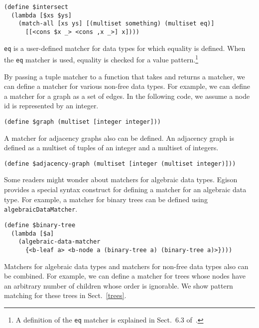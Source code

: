 \documentclass{article}
\begin{document}
\begin{lstlisting}[language=egison]
(define $intersect
  (lambda [$xs $ys]
    (match-all [xs ys] [(multiset something) (multiset eq)]
      [[<cons $x _> <cons ,x _>] x])))
\end{lstlisting}

\noindent \texttt{eq} is a user-defined matcher for data types for which equality is defined. 
When the \texttt{eq} matcher is used, equality is checked for a value pattern.\footnote{A definition of the \texttt{eq} matcher is explained in Sect.~6.3 of~\cite{egi2018Aplas}.}

By passing a tuple matcher to a function that takes and returns a matcher, we can define a matcher for various non-free data types.
For example, we can define a matcher for a graph as a set of edges.
In the following code, we assume a node id is represented by an integer.

{\footnotesize
\begin{lstlisting}[language=egison]
(define $graph (multiset [integer integer]))
\end{lstlisting}
}

\noindent A matcher for adjacency graphs also can be defined.
An adjacency graph is defined as a multiset of tuples of an integer and a multiset of integers.

{\footnotesize
\begin{lstlisting}[language=egison]
(define $adjacency-graph (multiset [integer (multiset integer)]))
\end{lstlisting}
}


\medskip

Some readers might wonder about matchers for algebraic data types.
Egison provides a special syntax construct for defining a matcher for an algebraic data type.
For example, a matcher for binary trees can be defined using \texttt{algebraicDataMatcher}.

{\footnotesize
\begin{lstlisting}[language=egison]
(define $binary-tree
  (lambda [$a]
    (algebraic-data-matcher
      {<b-leaf a> <b-node a (binary-tree a) (binary-tree a)>})))
\end{lstlisting}
}

Matchers for algebraic data types and matchers for non-free data types also can be combined.
For example, we can define a matcher for trees whose nodes have an arbitrary number of children whose order is ignorable.
We show pattern matching for these trees in Sect.~\ref{trees}.
\end{document}
